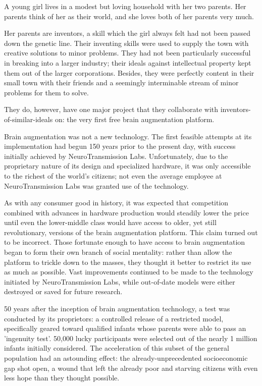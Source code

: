 \documentclass[12pt,titlepage]{article}
\begin{document}
A young girl lives in a modest but loving household with her two parents. Her
parents think of her as their world, and she loves both of her parents very
much.

Her parents are inventors, a skill which the girl always felt had not been
passed down the genetic line. Their inventing skills were used to supply the
town with creative solutions to minor problems. They had not been particularly
successful in breaking into a larger industry; their ideals against intellectual
property kept them out of the larger corporations. Besides, they were perfectly
content in their small town with their friends and a seemingly interminable
stream of minor problems for them to solve.

They do, however, have one major project that they collaborate with
inventors-of-similar-ideals on: the very first free brain augmentation platform.

Brain augmentation was not a new technology. The first feasible attempts at its
implementation had begun 150 years prior to the present day, with success
initially achieved by NeuroTransmission Labs. Unfortunately, due to the
proprietary nature of its design and specialized hardware, it was only
accessible to the richest of the world's citizens; not even the average employee
at NeuroTransmission Labs was granted use of the technology.

As with any consumer good in history, it was expected that competition combined
with advances in hardware production would steadily lower the price until even
the lower-middle class would have access to older, yet still revolutionary,
versions of the brain augmentation platform. This claim turned out to be
incorrect. Those fortunate enough to have access to brain augmentation began to
form their own branch of social mentality: rather than allow the platform to
trickle down to the masses, they thought it better to restrict its use as much
as possible. Vast improvements continued to be made to the technology initiated
by NeuroTransmission Labs, while out-of-date models were either destroyed or
saved for future research.

50 years after the inception of brain augmentation technology, a test was
conducted by its proprietors: a controlled release of a restricted model,
specifically geared toward qualified infants whose parents were able to pass an
'ingenuity test'. 50,000 lucky participants were selected out of the nearly 1
million infants initially considered. The acceleration of this subset of the
general population had an astounding effect: the already-unprecedented
socioeconomic gap shot open, a wound that left the already poor and starving
citizens with even less hope than they thought possible.
\end{document}
